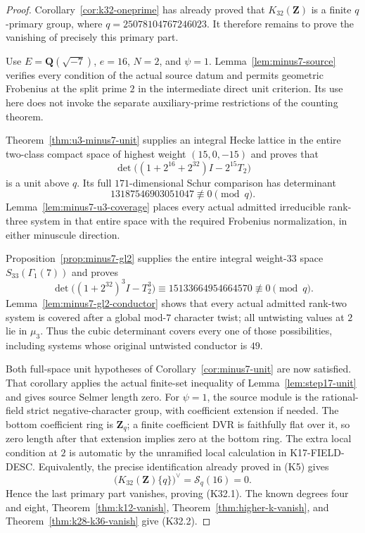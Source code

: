\begin{proof}
Corollary~\ref{cor:k32-oneprime} has already proved that
$K_{32}(\mathbf Z)$ is a finite $q$-primary group, where
$q=25078104767246023$. It therefore remains to prove the vanishing
of precisely this primary part.

Use $E=\mathbf Q(\sqrt{-7})$, $e=16$, $N=2$, and $\psi=1$.
Lemma~\ref{lem:minus7-source} verifies every condition of the actual
source datum and permits geometric Frobenius at the split prime $2$
in the intermediate direct unit criterion. Its use here does not
invoke the separate auxiliary-prime restrictions of the counting
theorem.

Theorem~\ref{thm:u3-minus7-unit} supplies an integral Hecke lattice
in the entire two-class compact space of highest weight $(15,0,-15)$
and proves that
\[
       \det\bigl((1+2^{16}+2^{32})I-2^{15}T_2\bigr)
\]
is a unit above $q$. Its full $171$-dimensional Schur comparison
has determinant
\[
                    13187546903051047\not\equiv0\pmod q.
\]
Lemma~\ref{lem:minus7-u3-coverage} places every actual admitted
irreducible rank-three system in that entire space with the required
Frobenius normalization, in either minuscule direction.

Proposition~\ref{prop:minus7-gl2} supplies the entire integral
weight-$33$ space $S_{33}(\Gamma_1(7))$ and proves
\[
 \det\bigl((1+2^{32})^3I-T_2^3\bigr)
       \equiv15133664954664570\not\equiv0\pmod q.
\]
Lemma~\ref{lem:minus7-gl2-conductor} shows that every actual
admitted rank-two system is covered after a global mod-$7$ character
twist; all untwisting values at $2$ lie in $\mu_3$.
Thus the cubic determinant covers every one of those possibilities,
including systems whose original untwisted conductor is $49$.

Both full-space unit hypotheses of Corollary~\ref{cor:minus7-unit}
are now satisfied. That corollary applies the actual finite-set
inequality of Lemma~\ref{lem:step17-unit} and gives source Selmer
length zero. For $\psi=1$, the source module is the rational-field
strict negative-character group, with coefficient extension if
needed. The bottom coefficient ring is $\mathbf Z_q$; a finite
coefficient DVR is faithfully flat over it, so zero length after
that extension implies zero at the bottom ring. The extra local
condition at $2$ is automatic by the unramified local calculation
in K17-FIELD-DESC. Equivalently, the precise identification already
proved in (K5) gives
\[
       \bigl(K_{32}(\mathbf Z)\{q\}\bigr)^\vee
                        =\mathcal S_q(16)=0.
\]
Hence the last primary part vanishes, proving (K32.1).
The known degrees four and eight, Theorem~\ref{thm:k12-vanish},
Theorem~\ref{thm:higher-k-vanish}, and
Theorem~\ref{thm:k28-k36-vanish} give (K32.2).


\end{proof}
